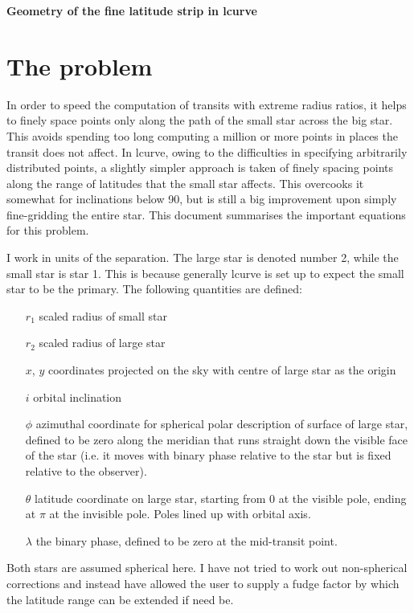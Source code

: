 \documentclass[10pt,a4paper]{article}
\begin{document}
\begin{center}
{\bf\large Geometry of the fine latitude strip in lcurve}\\
\end{center}

\section{The problem}

In order to speed the computation of transits with extreme radius ratios, it
helps to finely space points only along the path of the small star across the
big star. This avoids spending too long computing a million or more points in
places the transit does not affect. In lcurve, owing to the difficulties in
specifying arbitrarily distributed points, a slightly simpler approach is
taken of finely spacing points along the range of latitudes that the small
star affects. This overcooks it somewhat for inclinations below 90, but is
still a big improvement upon simply fine-gridding the entire star. This
document summarises the important equations for this problem.

I work in units of the separation. The large star is denoted number 2, 
while the small star is star 1. This is because generally lcurve is set
up to expect the small star to be the primary. The following quantities are 
defined:
\begin{enumerate}
\item[$r_1$] scaled radius of small star
\item[$r_2$] scaled radius of large star
\item[$x$, $y$] coordinates projected on the sky with 
centre of large star as the origin
\item[$i$] orbital inclination
\item[$\phi$] azimuthal coordinate for spherical polar description of surface
  of large star, defined to be zero along the meridian that runs straight down the
  visible face of the star (i.e. it moves with binary phase relative to the
  star but is fixed relative to the observer).
\item[$\theta$] latitude coordinate on large star, starting from 0 at the
  visible pole, ending at $\pi$ at the invisible pole. Poles lined up with
  orbital axis.
\item[$\lambda$] the binary phase, defined to be zero at the mid-transit point.
\end{enumerate}

Both stars are assumed spherical here. I have not tried to work out
non-spherical corrections and instead have allowed the user to supply a fudge
factor by which the latitude range can be extended if need be.
\end{document}
